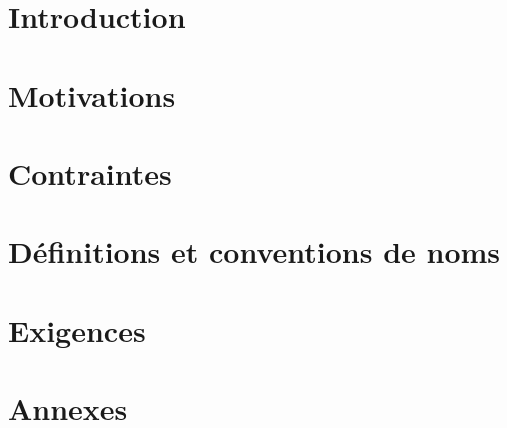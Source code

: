 



\pagestyle{fancy} 






\tableofcontents
{}


\chapter{Introduction}


\chapter{Motivations}


\chapter{Contraintes}


\chapter{Définitions et conventions de noms}


\chapter{Exigences}




\pagestyle{fancy} 





\appendix
\chapter{Annexes}


\listoffigures
{}
\listoftables




